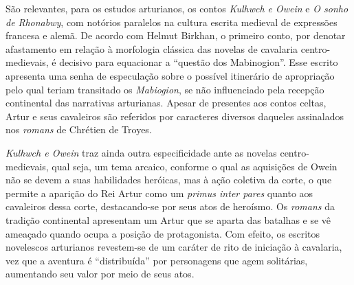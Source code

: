  São relevantes, para os estudos arturianos, os contos \textit{Kulhwch e Owein}
e \textit{O sonho de Rhonabwy}, com notórios paralelos na cultura escrita
medieval de expressões francesa e alemã. De acordo com Helmut Birkhan, o
primeiro conto, por denotar afastamento em relação à morfologia clássica das
novelas de cavalaria centro-medievais, é decisivo para equacionar a “questão
dos Mabinogion”. Esse escrito apresenta uma senha de especulação sobre o
possível itinerário de apropriação pelo qual teriam transitado os
\textit{Mabiogion}, se não influenciado pela recepção continental das
narrativas arturianas. Apesar de presentes aos contos celtas, Artur e seus
cavaleiros são referidos por caracteres diversos daqueles assinalados nos
\textit{romans} de Chrétien de Troyes.

\textit{Kulhwch e Owein }traz ainda outra especificidade ante as novelas
centro-medievais, qual seja, um tema arcaico, conforme o qual as aquisições de
Owein não se devem a suas habilidades heróicas, mas à ação coletiva da corte, o
que permite a aparição do Rei Artur como um \textit{primus inter pares} quanto
aos cavaleiros dessa corte, destacando-se por seus atos de heroísmo. Os
\textit{romans} da tradição continental apresentam um Artur que se aparta das
batalhas e se vê ameaçado quando ocupa a posição de protagonista. Com efeito,
os escritos novelescos arturianos revestem-se de um caráter de rito de
iniciação à cavalaria, vez que a aventura é “distribuída” por personagens que
agem solitárias, aumentando seu valor por meio de seus atos. 

